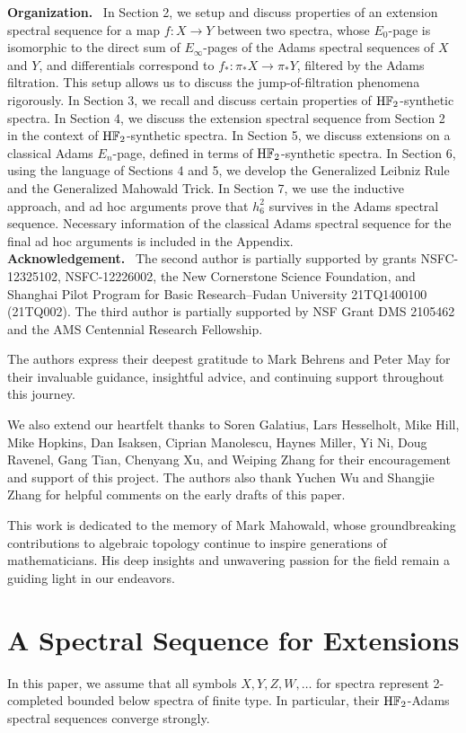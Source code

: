 \documentclass{amsart}
\numberwithin{equation}{section}
\newcommand{\HF}{\mathrm{H}\bF_2}
\begin{document}
\noindent\textbf{Organization.} \ In Section 2, we setup and discuss properties of an extension spectral sequence for a map $f: X\to Y$ between two spectra, whose $E_0$-page is isomorphic to the direct sum of $E_\infty$-pages of the Adams spectral sequences of $X$ and $Y$, and differentials correspond to $f_*: \pi_*X \to \pi_*Y$, filtered by the Adams filtration. This setup allows us to discuss the jump-of-filtration phenomena rigorously. In Section 3, we recall and discuss certain properties of $\HF$-synthetic spectra. In Section 4, we discuss the extension spectral sequence from Section 2 in the context of $\HF$-synthetic spectra. In Section 5, we discuss extensions on a classical Adams $E_n$-page, defined in terms of $\HF$-synthetic spectra. In Section 6, using the language of Sections 4 and 5, we develop the Generalized Leibniz Rule and the Generalized Mahowald Trick. In Section 7, we use the inductive approach, and ad hoc arguments prove that $h_6^2$ survives in the Adams spectral sequence. Necessary information of the classical Adams spectral sequence for the final ad hoc arguments is included in the Appendix.\\

\noindent\textbf{Acknowledgement.} \ The second author is partially supported by grants NSFC-12325102, NSFC-12226002, the New Cornerstone Science Foundation, and Shanghai Pilot Program for Basic Research–Fudan University 21TQ1400100 (21TQ002). The third author is partially supported by NSF Grant DMS 2105462 and the AMS Centennial Research Fellowship. 

The authors express their deepest gratitude to Mark Behrens and Peter May for their invaluable guidance, insightful advice, and continuing support throughout this journey.

We also extend our heartfelt thanks to Soren Galatius, Lars Hesselholt, Mike Hill, Mike Hopkins, Dan Isaksen, Ciprian Manolescu, Haynes Miller, Yi Ni, Doug Ravenel, Gang Tian, Chenyang Xu, and Weiping Zhang for their encouragement and support of this project. The authors also thank Yuchen Wu and Shangjie Zhang for helpful comments on the early drafts of this paper. 

This work is dedicated to the memory of Mark Mahowald, whose groundbreaking contributions to algebraic topology continue to inspire generations of mathematicians. His deep insights and unwavering passion for the field remain a guiding light in our endeavors.

\section{A Spectral Sequence for Extensions}\label{sec:e6be737c}
In this paper, we assume that all symbols $X,Y,Z,W,\dots$ for spectra represent 2-completed bounded below spectra of finite type. In particular, their $\HF$-Adams spectral sequences converge strongly.
\end{document}
